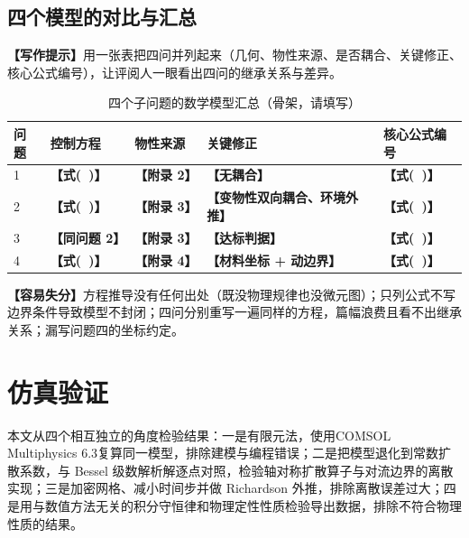 \documentclass[12pt,a4paper]{article}
\newcommand{\prompt}[1]{\par\noindent\textbf{【写作提示】}#1\par}      %
\newcommand{\pitfall}[1]{\par\noindent\textbf{【容易失分】}#1\par}     %
\newcommand{\ph}[1]{\textbf{【#1】}}                                   %
\newcommand{\figph}[1]{%
  \begin{center}
  \fbox{\parbox{0.88\textwidth}{\centering\vspace{2ex}#1\vspace{2ex}}}
  \end{center}}
\begin{document}



\subsection{四个模型的对比与汇总}

\prompt{用一张表把四问并列起来（几何、物性来源、是否耦合、关键修正、核心公式编号），让评阅人一眼看出四问的继承关系与差异。}

\begin{table}[H]
\centering
\caption{四个子问题的数学模型汇总（骨架，请填写）}
\label{tab:model-summary}
\begin{tabular}{p{1.5cm}p{3.3cm}p{2.8cm}p{3.3cm}p{3.4cm}}
\toprule
问题 & 控制方程 & 物性来源 & 关键修正 & 核心公式编号\\
\midrule
1 & \ph{式(\ )} & \ph{附录 2} & \ph{无耦合} & \ph{式(\ )}\\
2 & \ph{式(\ )} & \ph{附录 3} & \ph{变物性双向耦合、环境外推} & \ph{式(\ )}\\
3 & \ph{同问题 2} & \ph{附录 3} & \ph{达标判据} & \ph{式(\ )}\\
4 & \ph{式(\ )} & \ph{附录 4} & \ph{材料坐标 + 动边界} & \ph{式(\ )}\\
\bottomrule
\end{tabular}
\end{table}

\pitfall{方程推导没有任何出处（既没物理规律也没微元图）；只列公式不写边界条件导致模型不封闭；四问分别重写一遍同样的方程，篇幅浪费且看不出继承关系；漏写问题四的坐标约定。}


\section{仿真验证}

本文从四个相互独立的角度检验结果：一是有限元法，使用COMSOL Multiphysics 6.3复算同一模型，排除建模与编程错误；二是把模型退化到常数扩散系数，与 Bessel 级数解析解逐点对照，检验轴对称扩散算子与对流边界的离散实现；三是加密网格、减小时间步并做 Richardson 外推，排除离散误差过大；四是用与数值方法无关的积分守恒律和物理定性性质检验导出数据，排除不符合物理性质的结果。
\end{document}
